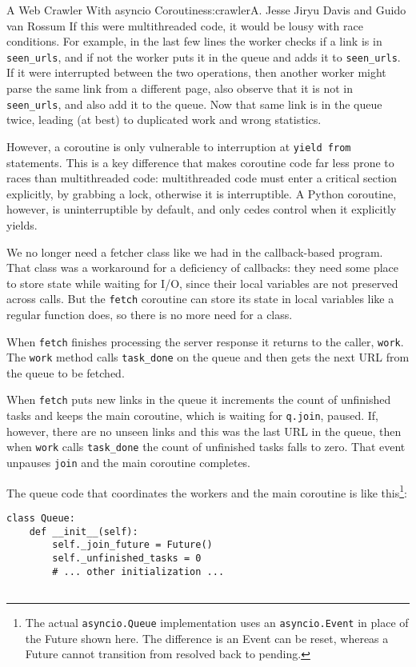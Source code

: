 \begin{aosachapter}{A Web Crawler With asyncio Coroutines}{s:crawler}{A. Jesse Jiryu Davis and Guido van Rossum}
If this were multithreaded code, it would be lousy with race conditions.
For example, in the last few lines the worker checks if a link is in
\texttt{seen\_urls}, and if not the worker puts it in the queue and adds
it to \texttt{seen\_urls}. If it were interrupted between the two
operations, then another worker might parse the same link from a
different page, also observe that it is not in \texttt{seen\_urls}, and
also add it to the queue. Now that same link is in the queue twice,
leading (at best) to duplicated work and wrong statistics.

However, a coroutine is only vulnerable to interruption at
\texttt{yield from} statements. This is a key difference that makes
coroutine code far less prone to races than multithreaded code:
multithreaded code must enter a critical section explicitly, by grabbing
a lock, otherwise it is interruptible. A Python coroutine, however, is
uninterruptible by default, and only cedes control when it explicitly
yields.

We no longer need a fetcher class like we had in the callback-based
program. That class was a workaround for a deficiency of callbacks: they
need some place to store state while waiting for I/O, since their local
variables are not preserved across calls. But the \texttt{fetch}
coroutine can store its state in local variables like a regular function
does, so there is no more need for a class.

When \texttt{fetch} finishes processing the server response it returns
to the caller, \texttt{work}. The \texttt{work} method calls
\texttt{task\_done} on the queue and then gets the next URL from the
queue to be fetched.

When \texttt{fetch} puts new links in the queue it increments the count
of unfinished tasks and keeps the main coroutine, which is waiting for
\texttt{q.join}, paused. If, however, there are no unseen links and this
was the last URL in the queue, then when \texttt{work} calls
\texttt{task\_done} the count of unfinished tasks falls to zero. That
event unpauses \texttt{join} and the main coroutine completes.

The queue code that coordinates the workers and the main coroutine is
like this\footnote{The actual \texttt{asyncio.Queue} implementation uses
  an \texttt{asyncio.Event} in place of the Future shown here. The
  difference is an Event can be reset, whereas a Future cannot
  transition from resolved back to pending.}:

\begin{verbatim}
class Queue:
    def __init__(self):
        self._join_future = Future()
        self._unfinished_tasks = 0
        # ... other initialization ...
    

\end{verbatim}
\end{aosachapter}
